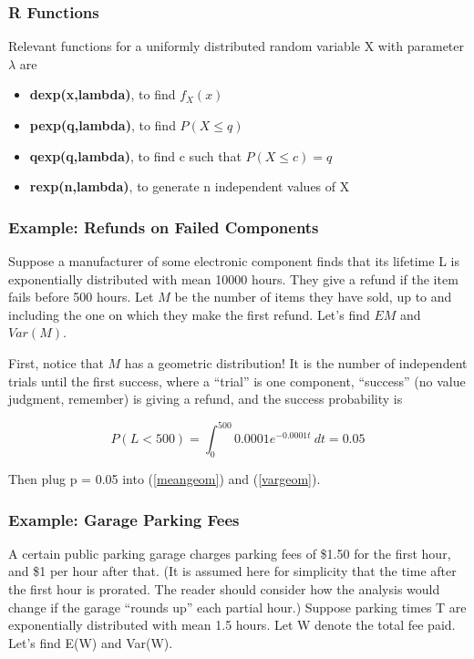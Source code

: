 \subsubsection{R Functions}

Relevant functions for a uniformly  distributed random variable X 
with parameter $\lambda$ are

\begin{itemize}

\item {\bf dexp(x,lambda)}, to find $f_X(x)$

\item {\bf pexp(q,lambda)}, to find $P(X \leq q)$

\item {\bf qexp(q,lambda)}, to find c such that $P(X \leq c) = q$

\item {\bf rexp(n,lambda)}, to generate n independent values of X

\end{itemize}

\subsubsection{Example:  Refunds on Failed Components}

Suppose a manufacturer of some electronic component finds that its
lifetime L is exponentially distributed with mean 10000 hours. They give a
refund if the item fails before 500 hours. Let $M$ be the number of items
they have sold, up to and including the one on which they make the first
refund. Let's find $EM$ and $Var(M)$.  

First, notice that $M$ has a geometric distribution!  It is the number of
independent trials until the first success, where a ``trial'' is one component,
``success'' (no value judgment, remember) is giving a refund, and the
success probability is

\begin{equation}
P(L < 500) = \int_{0}^{500} 0.0001 e^{-0.0001 t} ~ dt = 0.05
\end{equation}

Then plug p = 0.05 into (\ref{meangeom}) and (\ref{vargeom}). 

\subsubsection{Example:  Garage Parking Fees}

A certain public parking garage charges parking fees of \$1.50 for the
first hour, and \$1 per hour after that.  (It is assumed here for
simplicity that the time after the first hour is prorated.  The reader
should consider how the analysis would change if the garage ``rounds
up'' each partial hour.) Suppose parking times T are exponentially
distributed with mean 1.5 hours.  Let W denote the total fee paid.
Let's find E(W) and Var(W).

